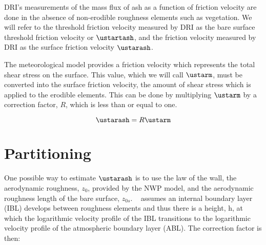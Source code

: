 DRI's measurements of the mass flux of ash as a function of friction velocity are done in the absence of non-erodible roughness elements such as vegetation. 
We will refer to the threshold friction velocity measured by DRI as the bare surface threshold friction velocity or $\ustartash$, and
the friction velocity measured by DRI as the surface friction velocity $\ustarash$. 

The meteorological model provides a friction velocity  which represents the total shear stress on the surface.
This value, which we will call $\ustarm$,  must be converted into the surface friction velocity, the amount of shear stress which is applied to the erodible elements.
This can be done by multiplying $\ustarm$ by a correction factor, $R$, which is less than or equal to one.

$$\ustarash =  R \ustarm$$


\section{Partitioning}


%





One possible way to estimate $\ustarash$ is to use the law of the wall, the aerodynamic roughness,
$z_0$, provided by the NWP model, and the aerodynamic roughness length of the bare surface, $z_{0s}$.
~\cite{Marticorena97} assumes an internal boundary layer (IBL) develops between roughness elements and thus there is a height, h, at which the
logarithmic velocity profile of the IBL transitions to the logarithmic velocity profile of the atmospheric boundary layer (ABL). 
The correction factor is then:

